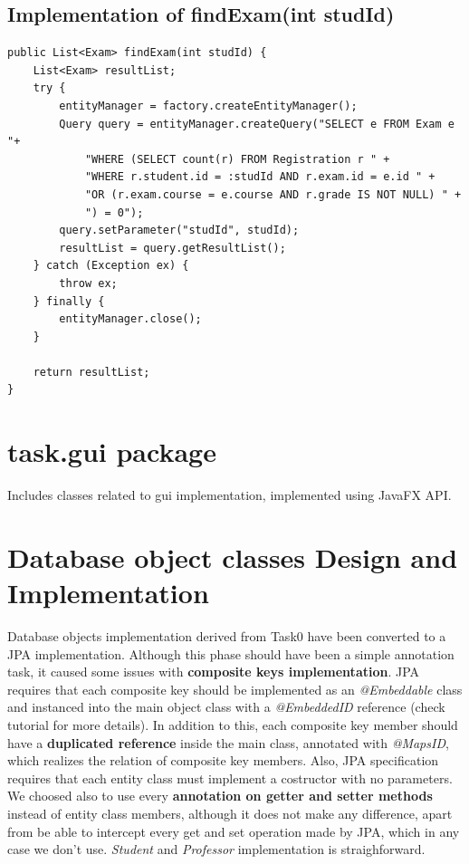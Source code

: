 \documentclass{report}
\begin{document}
\subsection*{Implementation of findExam(int studId)}
\begin{lstlisting}
public List<Exam> findExam(int studId) {
	List<Exam> resultList;
	try {
		entityManager = factory.createEntityManager();
		Query query = entityManager.createQuery("SELECT e FROM Exam e "+
			"WHERE (SELECT count(r) FROM Registration r " +
			"WHERE r.student.id = :studId AND r.exam.id = e.id " +
			"OR (r.exam.course = e.course AND r.grade IS NOT NULL) " +
			") = 0");
		query.setParameter("studId", studId);
		resultList = query.getResultList();
	} catch (Exception ex) {
		throw ex;
	} finally {
		entityManager.close();
	}

	return resultList;
}
\end{lstlisting}

\section*{task.gui package}
Includes classes related to gui implementation, implemented using JavaFX API.

\section*{Database object classes Design and Implementation}
Database objects implementation derived from Task0 have been converted to a JPA implementation. Although this phase should have been a simple annotation task, it caused some issues with \textbf{composite keys implementation}. 
\newline
JPA requires that each composite key should be implemented as an\textit{ @Embeddable} class and instanced into the main object class with a \textit{@EmbeddedID} reference (check tutorial for more details). In addition to this, each composite key member should have a \textbf{duplicated reference} inside the main class, annotated with \textit{@MapsID}, which realizes the relation of composite key members. \newline 
Also, JPA specification requires that each entity class must implement a costructor with no parameters. We choosed also to use every\textbf{ annotation on getter and setter methods} instead of entity class members, although it does not make any difference, apart from be able to intercept every get and set operation made by JPA, which in any case we don't use. \textit{Student} and \textit{Professor} implementation is straighforward.
\end{document}
